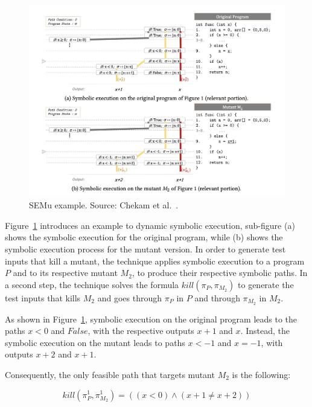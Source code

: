 \begin{figure}[tb]
\begin{center}
\includegraphics[width=\textwidth]{images/semu-example}
\caption{SEMu example. Source: Chekam et al.~\cite{chekam2021killing}.}
\label{fig:semu-example}
\end{center}
\end{figure}

Figure~\ref{fig:semu-example} introduces an example to dynamic symbolic execution, sub-figure (a) shows the symbolic execution for the original program, while (b) shows the symbolic execution process for the mutant version. In order to generate test inputs that kill a mutant, the technique applies symbolic execution to a program $P$ and to its respective mutant $M_2$, to produce their respective symbolic paths. In a second step, the technique solves the formula $kill(\pi_P, \pi_{M_2})$ to generate the test inputs that kills $M_2$ and goes through $\pi_P$ in $P$ and through $\pi_{M_2}$ in $M_2$. 

As shown in Figure~\ref{fig:semu-example}, symbolic execution on the original program leads to the paths $x < 0$ and $False$, with the respective outputs $x + 1$ and $x$.
Instead, the symbolic execution on the mutant leads to paths $x < -1$ and $x = -1$, with outputs $x + 2$ and $x + 1$.

Consequently, the only feasible path that targets mutant $M_2$ is the following:

\begin{equation}
	kill(\pi_{P}^{1}, \pi_{M_2}^{1}) = ((x < 0) \wedge (x + 1 \neq x + 2) )
\end{equation}

